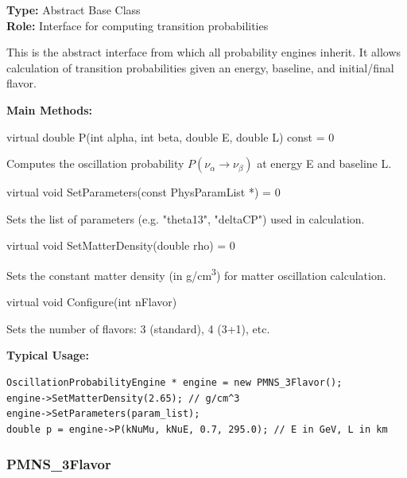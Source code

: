 \textbf{Type:} Abstract Base Class \\
\textbf{Role:} Interface for computing transition probabilities

This is the abstract interface from which all probability engines inherit.  
It allows calculation of transition probabilities given an energy, baseline, and initial/final flavor.

\vspace{0.5em}
\noindent\textbf{Main Methods:}

\begin{description}[align=left, labelsep=0.6em]

  \item[] {\color{cadmiumred} virtual double P(int alpha, int beta, double E, double L) const = 0}

  Computes the oscillation probability $P(\nu_\alpha \rightarrow \nu_\beta)$ at energy {\color{amber}E} and baseline {\color{amber}L}.

  \item[] {\color{cadmiumred} virtual void SetParameters(const PhysParamList *) = 0}

  Sets the list of parameters (e.g. {\color{amber}"theta13"}, {\color{amber}"deltaCP"}) used in calculation.

  \item[] {\color{cadmiumred} virtual void SetMatterDensity(double rho) = 0}

  Sets the constant matter density (in g/cm\textsuperscript{3}) for matter oscillation calculation.

  \item[] {\color{cadmiumred} virtual void Configure(int nFlavor)}

  Sets the number of flavors: 3 (standard), 4 (3+1), etc.

\end{description}

\vspace{0.5em}
\noindent\textbf{Typical Usage:}

\begin{lstlisting}
OscillationProbabilityEngine * engine = new PMNS_3Flavor();
engine->SetMatterDensity(2.65); // g/cm^3
engine->SetParameters(param_list);
double p = engine->P(kNuMu, kNuE, 0.7, 295.0); // E in GeV, L in km
\end{lstlisting}

\vspace{1em}
\subsubsection*{\color{cadmiumgreen}\bf PMNS\_3Flavor}


